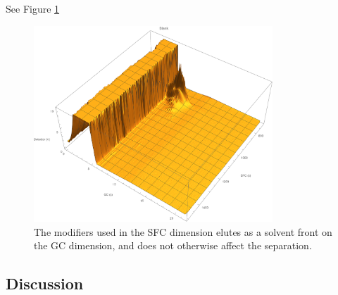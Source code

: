 See Figure \ref{fig:Modifier}

\begin{figure}
	\centering
	\includegraphics[width=0.8\textwidth]{Figures/Modifier.pdf}
	\decoRule	
	
	\caption[Modifiers in SFC]{The modifiers used in the SFC dimension elutes as a
solvent front on the GC dimension, and does not otherwise affect the separation.}
	
	\label{fig:Modifier} 
\end{figure}

\subsection{Discussion}